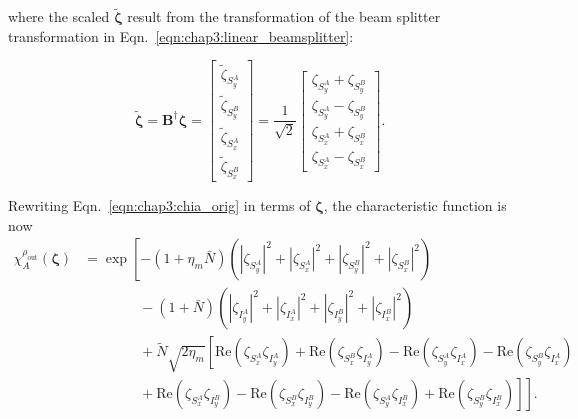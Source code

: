 \documentclass[aps,twocolumn,secnumarabic,amsmath,amssymb,pra,groupedaddress,
showpacs, showkeys]{revtex4-1}
\newcommand{\pna}[1]{\left(#1\right)}
\newcommand{\eqn}[1]{
\begin{equation}
	#1
\end{equation}
}
\begin{document}
where the scaled $\tilde{\bm{\zeta}}$ result from the transformation of the
beam splitter transformation in Eqn.~\ref{eqn:chap3:linear_beamsplitter}:
\eqn{
\tilde{\bm{\zeta}}=\mathbf{B}^{\dagger}\bm{\zeta}=\left[
\begin{array}{c}
	\tilde{\zeta}_{S_y^A} \\
	\tilde{\zeta}_{S_y^B} \\
	\tilde{\zeta}_{S_x^A} \\
	\tilde{\zeta}_{S_x^B}
\end{array}
\right]=\frac{1}{\sqrt{2}}
\left[
\begin{array}{c}
	\zeta_{S_y^A} + \zeta_{S_y^B} \\
	\zeta_{S_y^A} - \zeta_{S_y^B} \\
	\zeta_{S_x^A} + \zeta_{S_x^B}\\
	\zeta_{S_x^A} - \zeta_{S_x^B}
\end{array}
\right].\label{eq:scaled_vars}
}
Rewriting Eqn.~\ref{eqn:chap3:chia_orig} in terms of $\bm{\zeta}$, the
characteristic function is now
\begin{align}
    \chi_A^{\rho_{\textrm{out}}}\pna{\bm{\zeta}} 
    & = \exp\left[-\pna{1+\eta_{m}\bar{N}}\pna{|\zeta_{S_y^A}|^2+|\zeta_{S_x^A}|^2+|\zeta_{S_y^B}|^2+|\zeta_{S_x^B}|^2} \right.\nonumber \\
    & \qquad \qquad \left.{}-\pna{1+\bar{N}}\pna{|\zeta_{I_y^A}|^2+|\zeta_{I_x^A}|^2+|\zeta_{I_y^B}|^2+|\zeta_{I_x^B}|^2}\right.\nonumber \\ 
    & \qquad \qquad \left. {} +\tilde{N}\sqrt{2\eta_{m}}\left[
    \textrm{Re}\pna{\zeta_{S_x^A} \zeta_{I_y^A}}
    +\textrm{Re}\pna{\zeta_{S_x^B}\zeta_{I_y^A}}
    -\textrm{Re}\pna{\zeta_{S_y^A}\zeta_{I_x^A}}
    -\textrm{Re}\pna{\zeta_{S_y^B} \zeta_{I_x^A}}\right.\right.\nonumber \\
    & \qquad \qquad \left.\left. {} 
    +\textrm{Re}\pna{\zeta_{S_x^A}\zeta_{I_y^B}}
    -\textrm{Re}\pna{\zeta_{S_x^B}\zeta_{I_y^B}}
    -\textrm{Re}\pna{\zeta_{S_y^A}\zeta_{I_x^B}}
    +\textrm{Re}\pna{\zeta_{S_y^B} \zeta_{I_x^B}}\right]\right].
    \label{eq:char_final}
\end{align}
\end{document}

